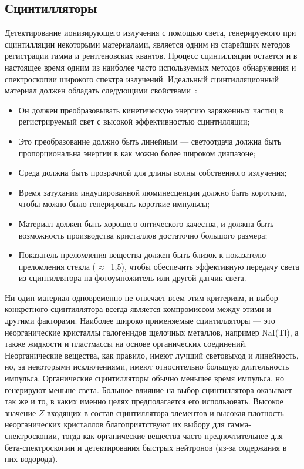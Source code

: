 
\subsection{ Сцинтилляторы }

Детектирование ионизирующего излучения с помощью света, генерируемого при сцинтилляции некоторыми материалами, является одним из старейших методов регистрации гамма и рентгеновских квантов. Процесс сцинтилляции остается и в настоящее время одним из наиболее часто используемых методов обнаружения и спектроскопии широкого спектра излучений. Идеальный сцинтилляционный материал должен обладать следующими свойствами~\cite{Knoll2010}:
\begin{itemize}
  \item Он должен преобразовывать кинетическую энергию заряженных частиц в регистрируемый свет с высокой эффективностью сцинтилляции;
  \item Это преобразование должно быть линейным --- светоотдача должна быть пропорциональна энергии в как можно более широком диапазоне;
  \item Среда должна быть прозрачной для длины волны собственного излучения;
  \item Время затухания индуцированной люминесценции должно быть коротким, чтобы можно было генерировать короткие импульсы;
  \item Материал должен быть хорошего оптического качества, и должна быть возможность производства кристаллов достаточно большого размера;
  \item Показатель преломления вещества должен быть близок к показателю преломления стекла ($\approx$~1,5), чтобы обеспечить эффективную передачу света из сцинтиллятора на фотоумножитель или другой датчик света.
\end{itemize}

Ни один материал одновременно не отвечает всем этим критериям, и выбор конкретного сцинтиллятора всегда является компромиссом между этими и другими факторами. Наиболее широко применяемые сцинтилляторы --- это неорганические кристаллы галогенидов щелочных металлов, например NaI(Tl), а также жидкости и пластмассы на основе органических соединений. Неорганические вещества, как правило, имеют лучший световыход и линейность, но, за некоторыми исключениями, имеют относительно большую длительность импульса. Органические сцинтилляторы обычно меньшее время импульса, но генерируют меньше света. Большое влияние на выбор сцинтиллятора оказывает так же и то, в каких именно целях предполагается его использовать. Высокое значение $Z$ входящих в состав сцинтиллятора элементов и высокая плотность неорганических кристаллов благоприятствуют их выбору для гамма-спектроскопии, тогда как органические вещества часто предпочтительнее для бета-спектроскопии и детектирования быстрых нейтронов (из-за содержания в них водорода).~\cite{Knoll2010}

